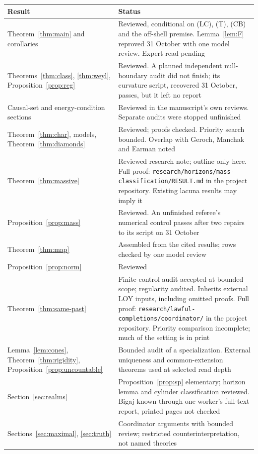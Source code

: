 \documentclass[11pt]{article}
\theoremstyle{definition}
\begin{document}
\begin{center}
\begin{tabularx}{\textwidth}{@{}lY@{}}
\toprule
Result & Status\\
\midrule
Theorem~\ref{thm:main} and corollaries & Reviewed, conditional on (LC), (T), (CB) and the off-shell premise. Lemma~\ref{lem:F} reproved 31 October with one model review. Expert read pending\\
Theorems~\ref{thm:class}, \ref{thm:weyl}, Proposition~\ref{prop:reg} & Reviewed. A planned independent null-boundary audit did not finish; its curvature script, recovered 31 October, passes, but it left no report\\
Causal-set and energy-condition sections & Reviewed in the manuscript's own reviews. Separate audits were stopped unfinished\\
Theorem~\ref{thm:char}, models, Theorem~\ref{thm:diamonds} & Reviewed; proofs checked. Priority search bounded. Overlap with Geroch, Manchak and Earman noted\\
Theorem~\ref{thm:massive} & Reviewed research note; outline only here. Full proof: \texttt{research/horizons/mass-classification/RESULT.md} in the project repository. Existing lacuna results may imply it\\
Proposition~\ref{prop:mass} & Reviewed. An unfinished referee's numerical control passes after two repairs to its script on 31 October\\
Theorem~\ref{thm:map} & Assembled from the cited results; rows checked by one model review\\
Proposition~\ref{prop:norm} & Reviewed\\
Theorem~\ref{thm:same-past} & Finite-control audit accepted at bounded scope; regularity audited. Inherits external LOY inputs, including omitted proofs. Full proof: \texttt{research/lawful-completions/coordinator/} in the project repository. Priority comparison incomplete; much of the setting is in print\\
Lemma~\ref{lem:cones}, Theorem~\ref{thm:rigidity}, Proposition~\ref{prop:uncountable} & Bounded audit of a specialization. External uniqueness and common-extension theorems used at selected read depth\\
Section~\ref{sec:realms} & Proposition~\ref{prop:sp} elementary; horizon lemma and cylinder classification reviewed. Bigaj known through one worker's full-text report, printed pages not checked\\
Sections~\ref{sec:maximal}, \ref{sec:truth} & Coordinator arguments with bounded review; restricted counterinterpretation, not named theories\\

\end{tabularx}
\end{center}
\end{document}
